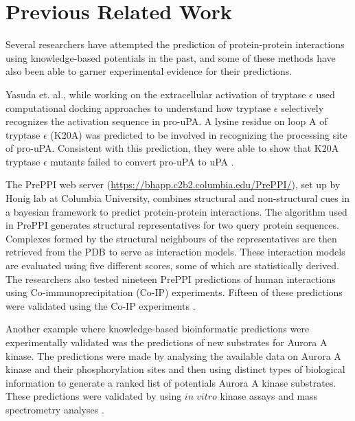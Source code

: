 \section{Previous Related Work}
Several researchers have attempted the prediction of protein-protein interactions using knowledge-based potentials in the past, and some of these methods have also been able  to garner experimental evidence for their predictions. 
\par
Yasuda et. al., while working on the extracellular activation of tryptase $\epsilon$ used computational docking approaches to understand how tryptase $\epsilon$ selectively recognizes the activation sequence in pro-uPA. A lysine residue on loop A of tryptase $\epsilon$ (K20A) was predicted to be involved in recognizing the processing site of pro-uPA. Consistent with this prediction, they were able to show that K20A tryptase $\epsilon$ mutants failed to convert pro-uPA to uPA \citep{Yasuda2005}.
\par
The PrePPI web server (\url{https://bhapp.c2b2.columbia.edu/PrePPI/}), set up by Honig lab at Columbia University, combines structural and non-structural cues in a bayesian framework to predict protein-protein interactions. The algorithm used in PrePPI generates structural representatives for two query protein sequences. Complexes formed by the structural neighbours of the representatives are then retrieved from the PDB to serve as interaction models. These interaction models are evaluated using five different scores, some of which are statistically derived. The researchers also tested nineteen PrePPI predictions of human interactions using Co-immunoprecipitation (Co-IP) experiments. Fifteen of these predictions were validated using the Co-IP experiments \citep{Zhang2012}.
\par
Another example where knowledge-based bioinformatic predictions were experimentally validated was the predictions of new substrates for Aurora A kinase. The predictions were made by analysing the available data on Aurora A kinase and their phosphorylation sites and then using distinct types of biological information to generate a ranked list of potentials Aurora A kinase substrates. These predictions were validated by using $in \; vitro$ kinase assays and mass spectrometry analyses \citep{Sardon2010}.

